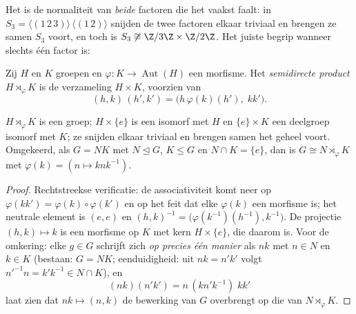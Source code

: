 Het is de normaliteit van \emph{beide} factoren die het vaakst
faalt: in $S_3 = \langle (1\,2\,3)\rangle \,\langle(1\,2)\rangle$
snijden de twee factoren elkaar triviaal en brengen ze samen $S_3$
voort, en toch is $S_3 \not\cong \Z/3\Z \times \Z/2\Z$. Het juiste
begrip wanneer slechts één factor  is:

\begin{definition}\label{def:b3:groups:semidirect}
Zij $H$ en $K$ groepen en $\varphi \colon K \to
\operatorname{Aut}(H)$ een morfisme. Het \emph{semidirecte
product} $H \rtimes_\varphi K$ is de
verzameling $H \times K$, voorzien van
\[
(h, k)\,(h', k') = \bigl(h\,\varphi(k)(h'),\; kk'\bigr).
\]
\end{definition}

\begin{proposition}\label{prop:b3:groups:semidirect}
$H \rtimes_\varphi K$ is een groep; $H \times \{e\}$ is een
 isomorf met $H$ en $\{e\} \times K$ een deelgroep
isomorf met $K$; ze snijden elkaar triviaal en brengen samen het
geheel voort. Omgekeerd, als $G = NK$ met $N \trianglelefteq G$, $K
\leq G$ en $N \cap K = \{e\}$, dan is $G \cong N \rtimes_\varphi K$
met $\varphi(k) = (n \mapsto knk^{-1})$.
\end{proposition}

\begin{proof}
Rechtstreekse verificatie: de associativiteit komt neer op
$\varphi(kk') = \varphi(k)\circ\varphi(k')$ en op het feit dat elke
$\varphi(k)$ een morfisme is; het neutrale element is $(e,e)$ en
$(h,k)^{-1} = \bigl(\varphi(k^{-1})(h^{-1}), k^{-1}\bigr)$. De
projectie $(h,k) \mapsto k$ is een morfisme op $K$ met kern $H
\times \{e\}$, die daarom  is. Voor de omkering: elke $g \in
G$ schrijft zich \emph{op precies één manier} als $nk$ met $n \in
N$ en $k \in K$ (bestaan: $G = NK$; eenduidigheid: uit $nk = n'k'$
volgt $n'^{-1}n = k'k^{-1} \in N \cap K$), en
\[
(nk)(n'k') = n\,(kn'k^{-1})\;kk'
\]
laat zien dat $nk \mapsto (n, k)$ de bewerking van $G$ overbrengt
op die van $N \rtimes_\varphi K$.
\end{proof}

